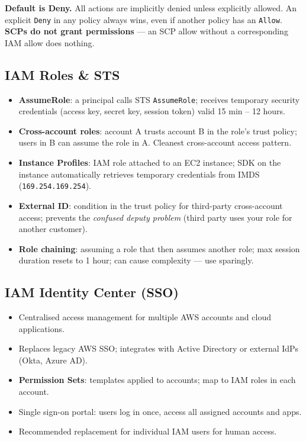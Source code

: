 \begin{examtip}
\textbf{Default is Deny.} All actions are implicitly denied unless explicitly allowed.
An explicit \texttt{Deny} in any policy always wins, even if another policy has an \texttt{Allow}.
\textbf{SCPs do not grant permissions} --- an SCP allow without a corresponding IAM allow does nothing.
\end{examtip}

\subsection{IAM Roles \& STS}

\begin{itemize}
  \item \textbf{AssumeRole}: a principal calls STS \texttt{AssumeRole}; receives temporary
        security credentials (access key, secret key, session token) valid 15 min -- 12 hours.
  \item \textbf{Cross-account roles}: account A trusts account B in the role's trust policy;
        users in B can assume the role in A. Cleanest cross-account access pattern.
  \item \textbf{Instance Profiles}: IAM role attached to an EC2 instance; SDK on the instance
        automatically retrieves temporary credentials from IMDS (\texttt{169.254.169.254}).
  \item \textbf{External ID}: condition in the trust policy for third-party cross-account access;
        prevents the \emph{confused deputy problem} (third party uses your role for another customer).
  \item \textbf{Role chaining}: assuming a role that then assumes another role; max session
        duration resets to 1 hour; can cause complexity --- use sparingly.
\end{itemize}

\subsection{IAM Identity Center (SSO)}

\begin{itemize}
  \item Centralised access management for multiple AWS accounts and cloud applications.
  \item Replaces legacy AWS SSO; integrates with Active Directory or external IdPs (Okta, Azure AD).
  \item \textbf{Permission Sets}: templates applied to accounts; map to IAM roles in each account.
  \item Single sign-on portal: users log in once, access all assigned accounts and apps.
  \item Recommended replacement for individual IAM users for human access.
\end{itemize}

